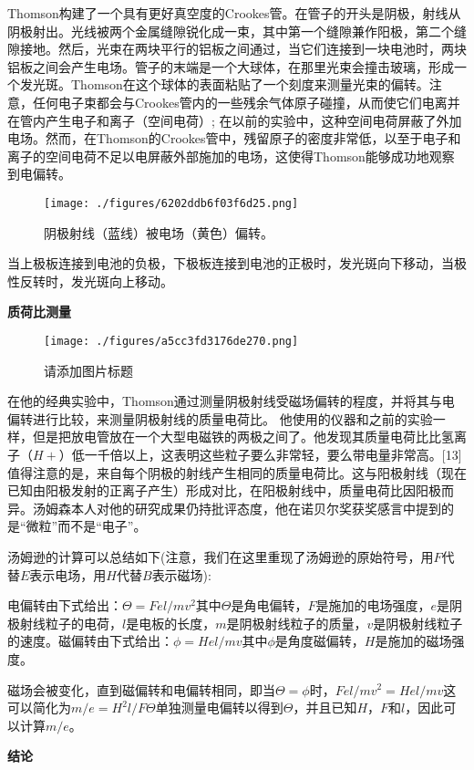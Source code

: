 Thomson构建了一个具有更好真空度的Crookes管。在管子的开头是阴极，射线从阴极射出。光线被两个金属缝隙锐化成一束，其中第一个缝隙兼作阳极，第二个缝隙接地。然后，光束在两块平行的铝板之间通过，当它们连接到一块电池时，两块铝板之间会产生电场。管子的末端是一个大球体，在那里光束会撞击玻璃，形成一个发光斑。Thomson在这个球体的表面粘贴了一个刻度来测量光束的偏转。注意，任何电子束都会与Crookes管内的一些残余气体原子碰撞，从而使它们电离并在管内产生电子和离子（空间电荷）; 在以前的实验中，这种空间电荷屏蔽了外加电场。然而，在Thomson的Crookes管中，残留原子的密度非常低，以至于电子和离子的空间电荷不足以电屏蔽外部施加的电场，这使得Thomson能够成功地观察到电偏转。
\begin{figure}[ht]
\centering
\texttt{[image: ./figures/6202ddb6f03f6d25.png]}
\caption{阴极射线（蓝线）被电场（黄色）偏转。} \label{fig_Joseph_4}
\end{figure}
当上极板连接到电池的负极，下极板连接到电池的正极时，发光斑向下移动，当极性反转时，发光斑向上移动。

\textbf{质荷比测量}

\begin{figure}[ht]
\centering
\texttt{[image: ./figures/a5cc3fd3176de270.png]}
\caption{请添加图片标题} \label{fig_Joseph_5}
\end{figure}
在他的经典实验中，Thomson通过测量阴极射线受磁场偏转的程度，并将其与电偏转进行比较，来测量阴极射线的质量电荷比。 他使用的仪器和之前的实验一样，但是把放电管放在一个大型电磁铁的两极之间了。他发现其质量电荷比比氢离子（$H+$）低一千倍以上，这表明这些粒子要么非常轻，要么带电量非常高。[13] 值得注意的是，来自每个阴极的射线产生相同的质量电荷比。这与阳极射线（现在已知由阳极发射的正离子产生）形成对比，在阳极射线中，质量电荷比因阳极而异。汤姆森本人对他的研究成果仍持批评态度，他在诺贝尔奖获奖感言中提到的是“微粒”而不是“电子”。

汤姆逊的计算可以总结如下(注意，我们在这里重现了汤姆逊的原始符号，用$F$代替$E$表示电场，用$H$代替$B$表示磁场):

电偏转由下式给出：$\Theta = Fel/mv^2$其中$\Theta$是角电偏转，$F$是施加的电场强度，$e$是阴极射线粒子的电荷，$l$是电板的长度，$m$是阴极射线粒子的质量，$v$是阴极射线粒子的速度。磁偏转由下式给出：$\phi = Hel/mv$其中$\phi$是角度磁偏转，$H$是施加的磁场强度。

磁场会被变化，直到磁偏转和电偏转相同，即当$\Theta = \phi$时，$Fel/mv^2 = Hel/mv$这可以简化为$m/e = H^2 l/F \Theta$单独测量电偏转以得到$\Theta$，并且已知$H$，$F$和$l$，因此可以计算$m / e$。

\textbf{结论}

